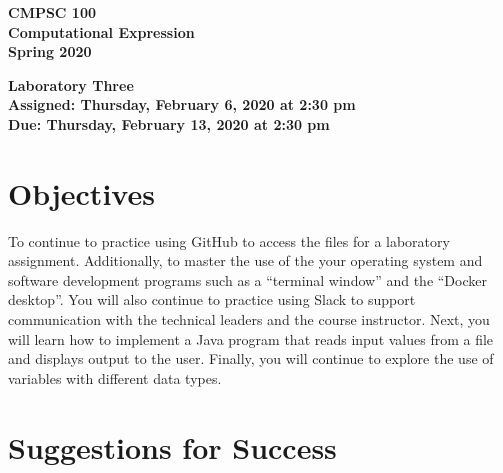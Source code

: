 \documentclass[11pt]{article}
\newcommand{\assignmentduedate}{February 13}
\newcommand{\assignmentassignedate}{February 6}
\newcommand{\assignmentnumber}{Three}
\newcommand{\labyear}{2020}
\newcommand{\labday}{Thursday}
\newcommand{\labtime}{2:30 pm}
\newcommand{\assigneddate}{Assigned: \labday, \assignmentassignedate, \labyear{} at \labtime{}}
\newcommand{\duedate}{Due: \labday, \assignmentduedate, \labyear{} at \labtime{}}
\newcommand{\labtitle}[1]
{
  \begin{center}
    \begin{center}
      \bf
      CMPSC 100\\Computational Expression\\
      Spring 2020\\
      \medskip
    \end{center}
    \bf
    #1
  \end{center}
}
\begin{document}
\thispagestyle{empty}

\labtitle{Laboratory \assignmentnumber{} \\ \assigneddate{} \\ \duedate{}}

\section*{Objectives}

To continue to practice using GitHub to access the files for a laboratory
assignment. Additionally, to master the use of the your operating system and
software development programs such as a ``terminal window'' and the ``Docker
desktop''. You will also continue to practice using Slack to support
communication with the technical leaders and the course instructor. Next, you
will learn how to implement a Java program that reads input values from a file
and displays output to the user. Finally, you will continue to explore the use
of variables with different data types.

\section*{Suggestions for Success}
\end{document}
